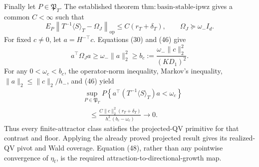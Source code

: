 Finally let \(P\in\mathfrak P_T\). The established theorem \(\mathrm{thm:basin\text{-}stable\text{-}ipwz}\) gives a common \(C<\infty\) such that
\[
 E_P\left\|T^{-1}\langle S\rangle_T-\Omega_J\right\|_{\mathrm{op}}
 \le C(r_T+\delta_T),
 \qquad \Omega_J\succeq\omega_-I_d.
\tag{46}
\]
For fixed \(c\ne0\), let \(a=H^{-\top}c\). Equations (30) and (46) give
\[
 a^\top\Omega_Ja
 \ge\omega_-\|a\|_2^2
 \ge b_c:=\frac{\omega_-\|c\|_2^2}{(KD_1)^2}.
\tag{47}
\]
For any \(0<\omega_c<b_c\), the operator-norm inequality, Markov's inequality, \(\|a\|_2\le\|c\|_2/h_-\), and (46) yield
\[
 \begin{aligned}
 &\sup_{P\in\mathfrak P_T}
 P\!\left\{a^\top(T^{-1}\langle S\rangle_T)a<\omega_c\right\}\\
 &\quad\le
 \frac{C\|c\|_2^2(r_T+\delta_T)}
 {h_-^2(b_c-\omega_c)}\longrightarrow0.
 \end{aligned}
\tag{48}
\]
Thus every finite-attractor class satisfies the projected-QV primitive for that contrast and floor. Applying the already proved projected result gives its realized-QV pivot and Wald coverage. Equation (48), rather than any pointwise convergence of \(\eta_t\), is the required attraction-to-directional-growth map.